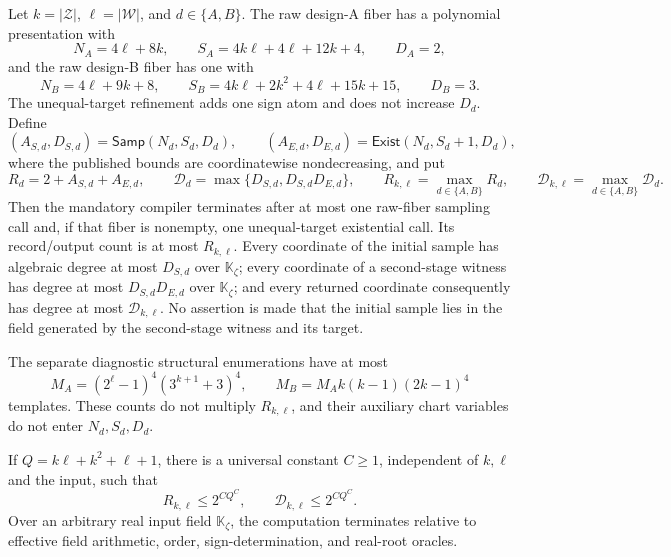 Let \(k=|\mathcal Z|\), \(\ell=|\mathcal W|\), and \(d\in\{A,B\}\).  The raw design-A fiber has a polynomial presentation with
\[
 N_A=4\ell+8k,\qquad
 S_A=4k\ell+4\ell+12k+4,\qquad
 D_A=2,
\]
and the raw design-B fiber has one with
\[
 N_B=4\ell+9k+8,\qquad
 S_B=4k\ell+2k^2+4\ell+15k+15,\qquad
 D_B=3.
\]
The unequal-target refinement adds one sign atom and does not increase \(D_d\).  Define
\[
 (A_{S,d},D_{S,d})=\mathsf{Samp}(N_d,S_d,D_d),
 \qquad
 (A_{E,d},D_{E,d})=\mathsf{Exist}(N_d,S_d+1,D_d),
\]
where the published bounds are coordinatewise nondecreasing, and put
\[
 R_d=2+A_{S,d}+A_{E,d},
 \qquad
 \mathcal D_d=\max\{D_{S,d},D_{S,d}D_{E,d}\},
 \qquad
 R_{k,\ell}=\max_{d\in\{A,B\}}R_d,
 \qquad
 \mathcal D_{k,\ell}=\max_{d\in\{A,B\}}\mathcal D_d.
\]
Then the mandatory compiler terminates after at most one raw-fiber sampling call and, if that fiber is nonempty, one unequal-target existential call.  Its record/output count is at most \(R_{k,\ell}\).  Every coordinate of the initial sample has algebraic degree at most \(D_{S,d}\) over \(\mathbb K_{\zeta}\); every coordinate of a second-stage witness has degree at most \(D_{S,d}D_{E,d}\) over \(\mathbb K_{\zeta}\); and every returned coordinate consequently has degree at most \(\mathcal D_{k,\ell}\).  No assertion is made that the initial sample lies in the field generated by the second-stage witness and its target.

The separate diagnostic structural enumerations have at most
\[
 M_A=(2^{\ell}-1)^4(3^{k+1}+3)^4,
 \qquad
 M_B=M_Ak(k-1)(2k-1)^4
\]
templates.  These counts do not multiply \(R_{k,\ell}\), and their auxiliary chart variables do not enter \(N_d,S_d,D_d\).

If \(Q=k\ell+k^2+\ell+1\), there is a universal constant \(C\ge1\), independent of \(k,\ell\) and the input, such that
\[
 R_{k,\ell}\le 2^{CQ^C},
 \qquad
 \mathcal D_{k,\ell}\le 2^{CQ^C}.
\]
Over an arbitrary real input field \(\mathbb K_{\zeta}\), the computation terminates relative to effective field arithmetic, order, sign-determination, and real-root oracles.


